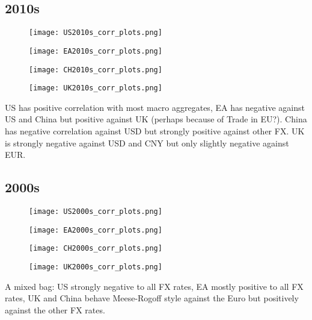 \documentclass{article}
\begin{document}
\subsection{2010s}
\begin{figure}[H]
    \centering
    \texttt{[image: US2010s\_corr\_plots.png]}
\end{figure}
\begin{figure}[H]
    \centering
    \texttt{[image: EA2010s\_corr\_plots.png]}
\end{figure}
\begin{figure}[H]
    \centering
    \texttt{[image: CH2010s\_corr\_plots.png]}
\end{figure}
\begin{figure}[H]
    \centering
    \texttt{[image: UK2010s\_corr\_plots.png]}
\end{figure}

US has positive correlation with most macro aggregates, EA has negative against US and China but positive against UK (perhaps because of Trade in EU?). 
China has negative correlation against USD but strongly positive against other FX. UK is strongly negative against USD and CNY but only slightly negative against EUR.

\subsection{2000s}
\begin{figure}[H]
    \centering
    \texttt{[image: US2000s\_corr\_plots.png]}
\end{figure}
\begin{figure}[H]
    \centering
    \texttt{[image: EA2000s\_corr\_plots.png]}
\end{figure}
\begin{figure}[H]
    \centering
    \texttt{[image: CH2000s\_corr\_plots.png]}
\end{figure}
\begin{figure}[H]
    \centering
    \texttt{[image: UK2000s\_corr\_plots.png]}
\end{figure}
A mixed bag: US strongly negative to all FX rates, EA mostly positive to all FX rates, UK and China behave Meese-Rogoff style against the Euro but positively against the other FX rates.
\end{document}
